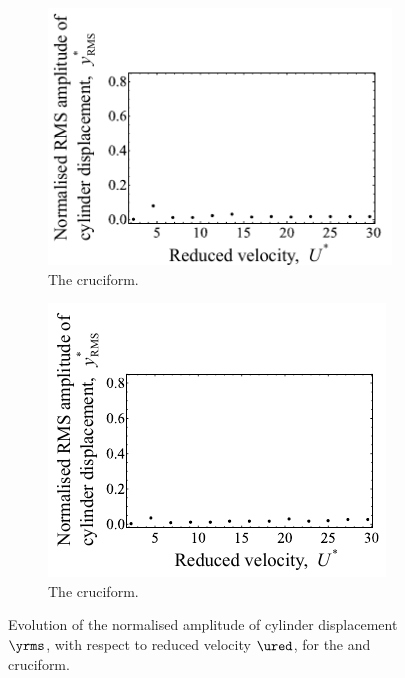 \documentclass[a4paper,fleqn]{cas-sc}
\begin{document}
\begin{figure}
  \centering
  \begin{subfigure}[h]{0.4\textwidth}
    \includegraphics[width=\textwidth]{figs/yStrRMS2}
  \caption{The \angfo{} cruciform.}
    \label{fig:yStrRMS2}
  \end{subfigure}
  \hspace{6mm}
  \begin{subfigure}[h]{0.4\textwidth}
    \includegraphics[width=\textwidth]{figs/yStrRMS3}
    \caption{The \angth{} cruciform.}
    \label{fig:yStrRMS3}
  \end{subfigure}

  \caption{Evolution of the normalised \rms{} amplitude of cylinder displacement $\yrms$, with respect to reduced velocity $\ured$, for the \angfo{} and \angth{} cruciform.}
  \label{fig:yStrRMS23}
\end{figure}
\end{document}
